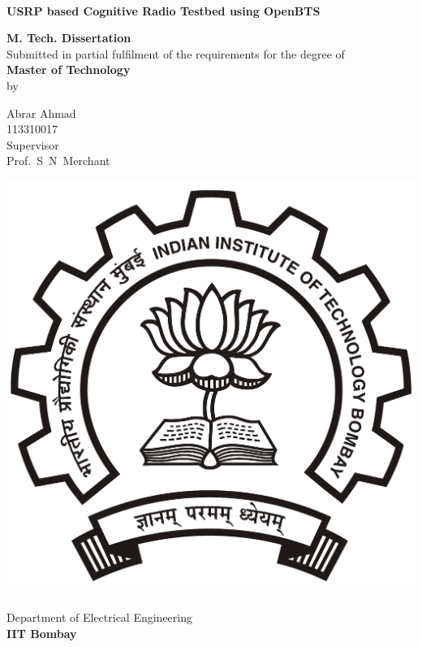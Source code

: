\begin{titlepage}
\begin{center}
\begin{spacing}{1.0}


~\\[0.3cm]
{ \LARGE \bfseries USRP based Cognitive Radio Testbed using OpenBTS\\[1.2cm] }

\textbf{\large M. Tech. Dissertation}\\[1.2cm]

{Submitted in partial fulfilment of the requirements for the degree of\\[0.1cm]
\textbf{Master of Technology}\\[0.3cm]
by\\[0.3cm]}

{\LARGE Abrar Ahmad\\[0.1cm]}
{113310017\\[1.1cm]}
{Supervisor\\[0.1cm]}
{\LARGE Prof.~S~N~Merchant\\[1.3cm]}

\includegraphics[width=0.21\textheight]{iitbLogo}~\\[0.9cm]
Department of Electrical Engineering\\[0.2cm]
\textbf{\large IIT Bombay}\\[1.3cm]


\end{spacing}
\end{center}
\end{titlepage}
